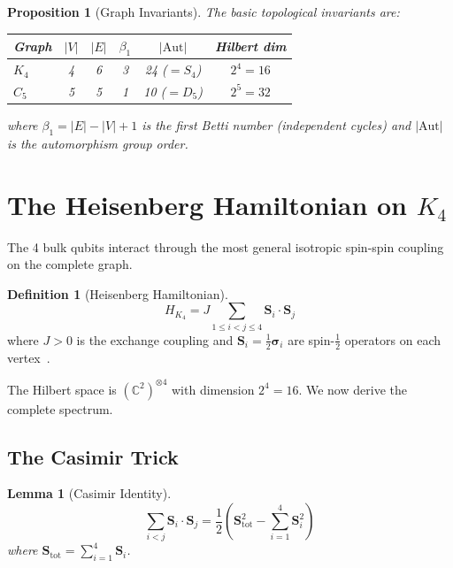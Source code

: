 \documentclass[11pt,a4paper]{article}
\newtheorem{proposition}[theorem]{Proposition}
\newtheorem{lemma}[theorem]{Lemma}
\theoremstyle{definition}
\newtheorem{definition}[theorem]{Definition}
\begin{document}
\begin{proposition}[Graph Invariants]
\label{S1:prop:invariants}
The basic topological invariants are:
\begin{center}
\begin{tabular}{lccccc}
\toprule
\textbf{Graph} & $|V|$ & $|E|$ & $\beta_1$ & $|\mathrm{Aut}|$ & Hilbert dim \\
\midrule
$K_4$ & 4 & 6 & 3 & 24 ($= S_4$) & $2^4 = 16$ \\
$C_5$ & 5 & 5 & 1 & 10 ($= D_5$) & $2^5 = 32$ \\
\bottomrule
\end{tabular}
\end{center}
where $\beta_1 = |E| - |V| + 1$ is the first Betti number (independent cycles) and $|\mathrm{Aut}|$ is the automorphism group order.
\end{proposition}

\section{The Heisenberg Hamiltonian on \texorpdfstring{$K_4$}{K4}}
\label{sec:heisenberg}

The 4 bulk qubits interact through the most general isotropic spin-spin coupling on the complete graph.

\begin{definition}[Heisenberg Hamiltonian]
\label{S1:def:heisenberg}
\begin{equation}
H_{K_4} = J \sum_{1 \leq i < j \leq 4} \mathbf{S}_i \cdot \mathbf{S}_j
\label{S1:eq:HK4}
\end{equation}
where $J > 0$ is the exchange coupling and $\mathbf{S}_i = \tfrac{1}{2}\boldsymbol{\sigma}_i$ are spin-$\tfrac{1}{2}$ operators on each vertex~\cite{Auerbach1994}.
\end{definition}

The Hilbert space is $(\mathbb{C}^2)^{\otimes 4}$ with dimension $2^4 = 16$. We now derive the complete spectrum.

\subsection{The Casimir Trick}

\begin{lemma}[Casimir Identity]
\label{S1:lem:casimir}
\begin{equation}
\sum_{i<j} \mathbf{S}_i \cdot \mathbf{S}_j = \frac{1}{2}\!\left(\mathbf{S}_{\mathrm{tot}}^2 - \sum_{i=1}^{4} \mathbf{S}_i^2\right)
\label{S1:eq:casimir}
\end{equation}
where $\mathbf{S}_{\mathrm{tot}} = \sum_{i=1}^{4} \mathbf{S}_i$.
\end{lemma}
\end{document}
